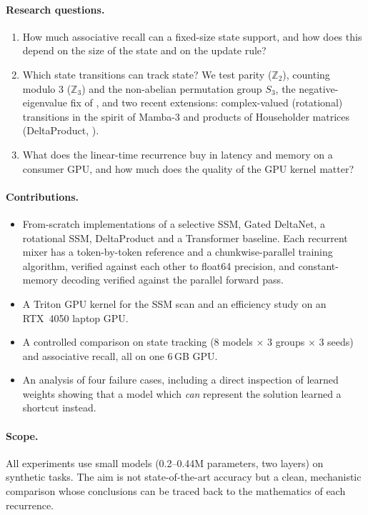 \paragraph{Research questions.}
\begin{enumerate}
  \item[\textbf{RQ1}] How much associative recall can a fixed-size state support, and how does this depend
        on the size of the state and on the update rule?
  \item[\textbf{RQ2}] Which state transitions can track state? We test parity ($\mathbb{Z}_2$), counting
        modulo 3 ($\mathbb{Z}_3$) and the non-abelian permutation group $S_3$, the negative-eigenvalue fix
        of \citet{grazzi2025unlocking}, and two recent extensions: complex-valued (rotational) transitions
        in the spirit of Mamba-3 \citep{mamba3} and products of Householder matrices
        (DeltaProduct, \citealp{siems2025deltaproduct}).
  \item[\textbf{RQ3}] What does the linear-time recurrence buy in latency and memory on a consumer GPU, and
        how much does the quality of the GPU kernel matter?
\end{enumerate}

\paragraph{Contributions.}
\begin{itemize}
  \item From-scratch implementations of a selective SSM, Gated DeltaNet, a rotational SSM, DeltaProduct
        and a Transformer baseline. Each recurrent mixer has a token-by-token reference and a
        chunkwise-parallel training algorithm, verified against each other to float64 precision, and
        constant-memory decoding verified against the parallel forward pass.
  \item A Triton GPU kernel for the SSM scan and an efficiency study on an RTX~4050 laptop GPU.
  \item A controlled comparison on state tracking (8 models $\times$ 3 groups $\times$ 3 seeds) and
        associative recall, all on one 6\,GB GPU.
  \item An analysis of four failure cases, including a direct inspection of learned weights showing that a
        model which \emph{can} represent the solution learned a shortcut instead.
\end{itemize}

\paragraph{Scope.} All experiments use small models (0.2--0.44M parameters, two layers) on synthetic
tasks. The aim is not state-of-the-art accuracy but a clean, mechanistic comparison whose conclusions can
be traced back to the mathematics of each recurrence.

